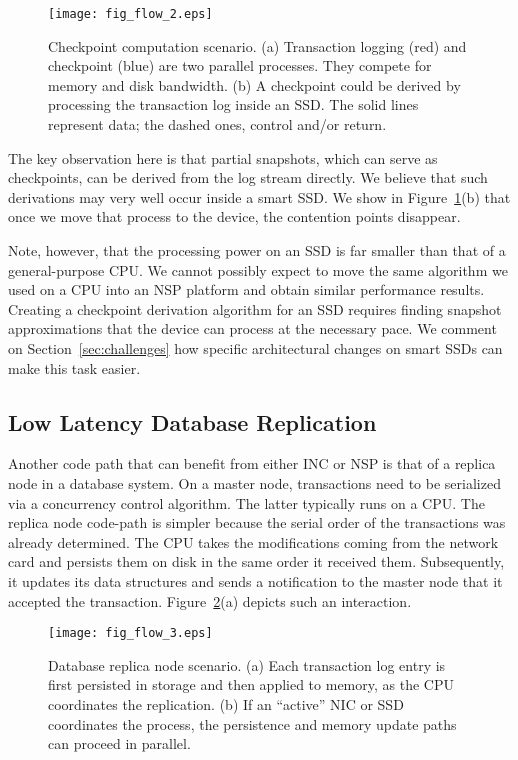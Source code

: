 \documentclass[11pt,dvipdfmx]{article}
\begin{document}
\begin{figure}[h]
  \centering
  \texttt{[image: fig\_flow\_2.eps]} %
  \caption{Checkpoint computation scenario.
    (a) Transaction logging (red) and checkpoint (blue) are two parallel
    processes.
    They compete for memory and disk bandwidth.
    (b) A checkpoint could be derived by processing the transaction log inside
    an SSD.
    The solid lines represent data; the dashed ones, control and/or return.
  }
  \label{fig:flow_2}
\end{figure}


The key observation here is that partial snapshots, which can serve as
checkpoints, can be derived from the log stream directly.
We believe that such derivations may very well occur inside a smart SSD.
We show in Figure~\ref{fig:flow_2}(b) that once we move that process to the
device, the contention points disappear.


Note, however, that the processing power on an SSD is far smaller than that of a
general-purpose CPU.
We cannot possibly expect to move the same algorithm we used on a CPU into an
NSP platform and obtain similar performance results.
Creating a checkpoint derivation algorithm for an SSD requires finding snapshot
approximations that the device can process at the necessary pace.
We comment on Section~\ref{sec:challenges} how specific architectural changes on
smart SSDs can make this task easier.


\subsection{Low Latency Database Replication}
\label{ssec:low_latency}


Another code path that can benefit from either INC or NSP is that of a replica
node in a database system.
On a master node, transactions need to be serialized via a concurrency control
algorithm.
The latter typically runs on a CPU.
The replica node code-path is simpler because the serial order of the
transactions was already determined.
The CPU takes the modifications coming from the network card and persists them
on disk in the same order it received them.
Subsequently, it updates its data structures and sends a notification to the
master node that it accepted the transaction.
Figure~\ref{fig:flow_3}(a) depicts such an interaction.


\begin{figure}[h]
  \centering
  \texttt{[image: fig\_flow\_3.eps]} %
  \caption{Database replica node scenario.
    (a) Each transaction log entry is first persisted in storage and then
    applied to memory, as the CPU coordinates the replication.
    (b) If an ``active'' NIC or SSD coordinates the process, the persistence and
    memory update paths can proceed in parallel.
  }
  \label{fig:flow_3}
\end{figure}
\end{document}
